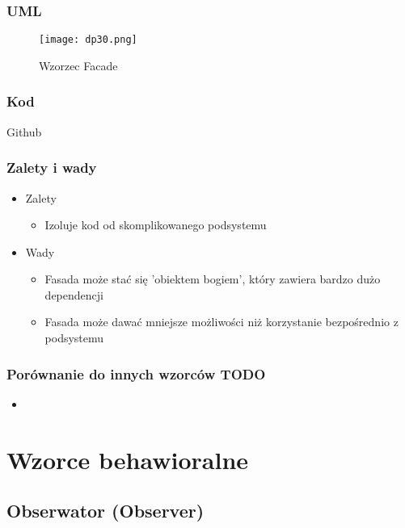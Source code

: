 \documentclass[a4paper,15pt]{article}
\begin{document}
\subsubsection{UML}

\begin{figure}[H]
\centering
  \texttt{[image: dp30.png]}
  \caption{Wzorzec Facade}
\end{figure}

\subsubsection{Kod}
Github

\subsubsection{Zalety i wady}


\begin{itemize}
\item Zalety
\begin{itemize}
\item Izoluje kod od skomplikowanego podsystemu
\end{itemize}
\item Wady
\begin{itemize}
\item Fasada może stać się 'obiektem bogiem', który zawiera bardzo dużo dependencji
\item Fasada może dawać mniejsze możliwości niż korzystanie bezpośrednio z podsystemu
\end{itemize}
\end{itemize}


\subsubsection{Porównanie do innych wzorców TODO}
\begin{itemize}
\item
\end{itemize}



\newpage
\section{Wzorce behawioralne}

\subsection{Obserwator (Observer)}
\end{document}
